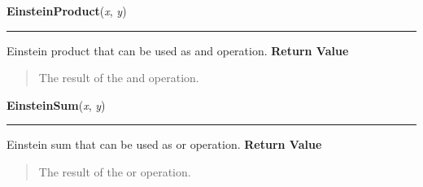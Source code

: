     \label{peach:fuzzy:norms:EinsteinProduct}

    \vspace{0.5ex}

\hspace{.8\funcindent}\begin{boxedminipage}{\funcwidth}

    \raggedright \textbf{EinsteinProduct}(\textit{x}, \textit{y})

    \vspace{-1.5ex}

    \rule{\textwidth}{0.5\fboxrule}
\setlength{\parskip}{2ex}

Einstein product that can be used as and operation.
\setlength{\parskip}{1ex}
      \textbf{Return Value}
    \vspace{-1ex}

      \begin{quote}

The result of the and operation.
      \end{quote}

    \end{boxedminipage}

    \label{peach:fuzzy:norms:EinsteinSum}

    \vspace{0.5ex}

\hspace{.8\funcindent}\begin{boxedminipage}{\funcwidth}

    \raggedright \textbf{EinsteinSum}(\textit{x}, \textit{y})

    \vspace{-1.5ex}

    \rule{\textwidth}{0.5\fboxrule}
\setlength{\parskip}{2ex}

Einstein sum that can be used as or operation.
\setlength{\parskip}{1ex}
      \textbf{Return Value}
    \vspace{-1ex}

      \begin{quote}

The result of the or operation.
      \end{quote}

    \end{boxedminipage}

